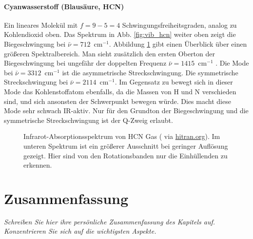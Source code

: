 \paragraph{Cyanwasserstoff (Blausäure, HCN)}  
\begin{marginfigure}
\end{marginfigure}
Ein lineares Molekül mit $f=9 - 5 = 4$ Schwingungsfreiheitsgraden, analog zu Kohlendioxid oben. Das Spektrum in Abb. \ref{fig:vib_hcn} weiter oben zeigt die Biegeschwingung bei $\bar{\nu} = 712$~cm$^{-1}$.  Abbildung \ref{fig:vib_hcn_all} gibt einen Überblick über einen größeren Spektralbereich. Man sieht zusätzlich den 
ersten Oberton der Biegeschwingung bei ungefähr der doppelten Frequenz  $\bar{\nu} = 1415$~cm$^{-1}$
. Die Mode bei  $\bar{\nu} = 3312$~cm$^{-1}$ ist die  asymmetrische Streckschwingung. Die symmetrische Streckschwingung  bei $\bar{\nu} = 2114$~cm$^{-1}$.
 Im Gegensatz zu  bewegt sich in dieser Mode das Kohlenstoffatom ebenfalls, da die Massen von H und N verschieden sind, und sich ansonsten der  Schwerpunkt bewegen würde. Dies macht diese Mode sehr schwach IR-aktiv.  Nur für den Grundton der Biegeschwingung und die  symmetrische Streckschwingung ist der Q-Zweig erlaubt.

\begin{figure}
\caption{Infrarot-Absorptionsspektrum von HCN Gas  (\cite{Maki_1995_HCN} via \href{https://hitran.org}{hitran.org}). Im unteren Spektrum ist ein größerer Ausschnitt bei geringer Auflösung gezeigt. Hier sind von den Rotationsbanden nur die Einhüllenden zu erkennen.
\label{fig:vib_hcn_all}}
\end{figure}







\section{Zusammenfassung}

\textit{Schreiben Sie hier ihre persönliche Zusammenfassung des Kapitels auf. Konzentrieren Sie sich auf die wichtigsten Aspekte.}

\vspace*{10cm}


\printbibliography[segment=\therefsegment,heading=subbibliography]
